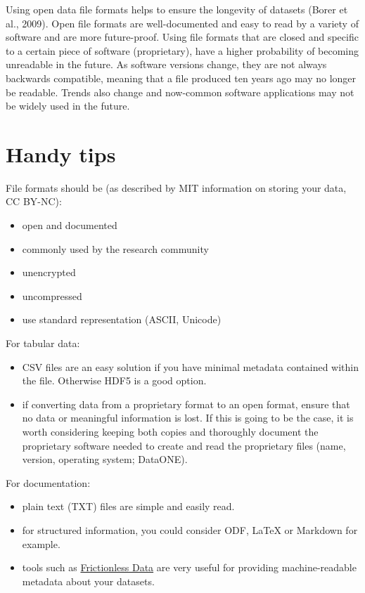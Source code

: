 \documentclass[a4paper,oneside]{report}
\providecommand{\tightlist}{%
  \setlength{\itemsep}{0pt}\setlength{\parskip}{0pt}}
\begin{document}
Using open data file formats helps to ensure the longevity of datasets
(Borer et al., 2009). Open file formats are well-documented and easy to
read by a variety of software and are more future-proof. Using file
formats that are closed and specific to a certain piece of software
(proprietary), have a higher probability of becoming unreadable in the
future. As software versions change, they are not always backwards
compatible, meaning that a file produced ten years ago may no longer be
readable. Trends also change and now-common software applications may
not be widely used in the future.

\hypertarget{handy-tips-2}{%
\section{Handy tips}\label{handy-tips-2}}

File formats should be (as described by MIT information on storing your
data, CC BY-NC):

\begin{itemize}
\tightlist
\item
  open and documented
\item
  commonly used by the research community
\item
  unencrypted
\item
  uncompressed
\item
  use standard representation (ASCII, Unicode)
\end{itemize}

For tabular data:

\begin{itemize}
\tightlist
\item
  CSV files are an easy solution if you have minimal metadata contained
  within the file. Otherwise HDF5 is a good option.
\item
  if converting data from a proprietary format to an open format, ensure
  that no data or meaningful information is lost. If this is going to be
  the case, it is worth considering keeping both copies and thoroughly
  document the proprietary software needed to create and read the
  proprietary files (name, version, operating system; DataONE).
\end{itemize}

For documentation:

\begin{itemize}
\tightlist
\item
  plain text (TXT) files are simple and easily read.
\item
  for structured information, you could consider ODF, LaTeX or Markdown
  for example.
\item
  tools such as \href{https://frictionlessdata.io/}{Frictionless Data}
  are very useful for providing machine-readable metadata about your
  datasets.
\end{itemize}
\end{document}
